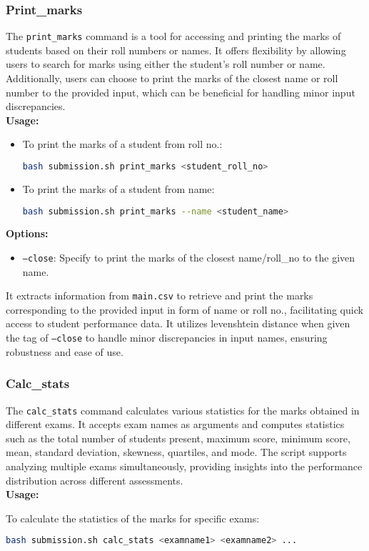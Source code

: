 \documentclass{article}
\begin{document}
\subsubsection{Print\_marks}
The \texttt{print\_marks} command is a tool for accessing and printing the marks of students based on their roll numbers or names. It offers flexibility by allowing users to search for marks using either the student's roll number or name. Additionally, users can choose to print the marks of the closest name or roll number to the provided input, which can be beneficial for handling minor input discrepancies.\\
\textbf{Usage:}
\begin{itemize}
    \item To print the marks of a student from roll no.:
    \begin{lstlisting}[language=bash]
    bash submission.sh print_marks <student_roll_no>
    \end{lstlisting}
    \item To print the marks of a student from name:
    \begin{lstlisting}[language=bash]
    bash submission.sh print_marks --name <student_name>
    \end{lstlisting}
\end{itemize}

\textbf{Options:}
\begin{itemize}
    \item \texttt{--close}: Specify to print the marks of the closest name/roll\_no to the given name.
\end{itemize}

It extracts information from \texttt{main.csv} to retrieve and print the marks corresponding to the provided input in form of name or roll no., facilitating quick access to student performance data. It utilizes levenshtein distance when given the tag of \texttt{--close} to handle minor discrepancies in input names, ensuring robustness and ease of use. 

\subsubsection{Calc\_stats}
The \texttt{calc\_stats} command calculates various statistics for the marks obtained in different exams. It accepts exam names as arguments and computes statistics such as the total number of students present, maximum score, minimum score, mean, standard deviation, skewness, quartiles, and mode. The script supports analyzing multiple exams simultaneously, providing insights into the performance distribution across different assessments.\\
\textbf{Usage:}
\begin{adjustwidth}{0.5cm}{0cm}
To calculate the statistics of the marks for specific exams:
\begin{lstlisting}[language=bash]
bash submission.sh calc_stats <examname1> <examname2> ...
\end{lstlisting}
\end{adjustwidth}
\end{document}
